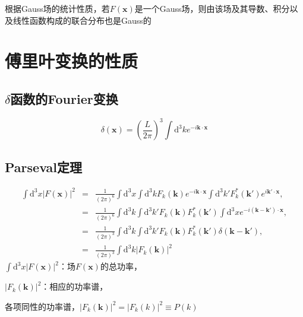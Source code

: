 \documentclass[12pt,a4paper]{article}
\renewcommand{\vec}[1]{\boldsymbol{#1}}
\newcommand{\dif}{\mathrm{d}}
\begin{document}
根据Gauss场的统计性质，若$F(\vec{x})$是一个Gauss场，则由该场及其导数、积分以及线性函数构成的联合分布也是Gauss的



\section{傅里叶变换的性质}

\subsection{$\delta$函数的Fourier变换}
\begin{equation}
\delta(\vec{x}) = \left(\frac{L}{2\pi} \right)^3 \int \dif^3 k e^{-i\vec{k}\cdot \vec{x}} 
\end{equation}


\subsection{Parseval定理}
\begin{eqnarray}
\nonumber \int \dif^3 x |F(\vec{x})|^2 &=& \frac{1}{(2\pi)^6} \int \dif^3 x\int \dif^3 k F_k(\vec{k}) e^{-i\vec{k} \cdot \vec{x}} \int \dif^3 k' F^*_k(\vec{k}') e^{i\vec{k}' \cdot \vec{x}}, \\
\nonumber &=& \frac{1}{(2\pi)^6} \int \dif^3 k \int \dif^3 k'  F_k(\vec{k}) F^*_k(\vec{k}') \int \dif^3 x e^{-i(\vec{k}-\vec{k}') \cdot \vec{x}}, \\
\nonumber &=& \frac{1}{(2\pi)^3} \int \dif^3 k \int \dif^3 k'  F_k(\vec{k}) F^*_k(\vec{k}') \delta(\vec{k}-\vec{k}'), \\
&=& \frac{1}{(2\pi)^3} \int \dif^3 k |F_k(\vec{k})|^2
\end{eqnarray}
$\int \dif^3 x |F(\vec{x})|^2$：场$F(\vec{x})$的总功率，

$|F_k(\vec{k})|^2$：相应的功率谱，

各项同性的功率谱，$|F_k(\vec{k})|^2 = |F_k(k)|^2 \equiv P(k)$
\end{document}
